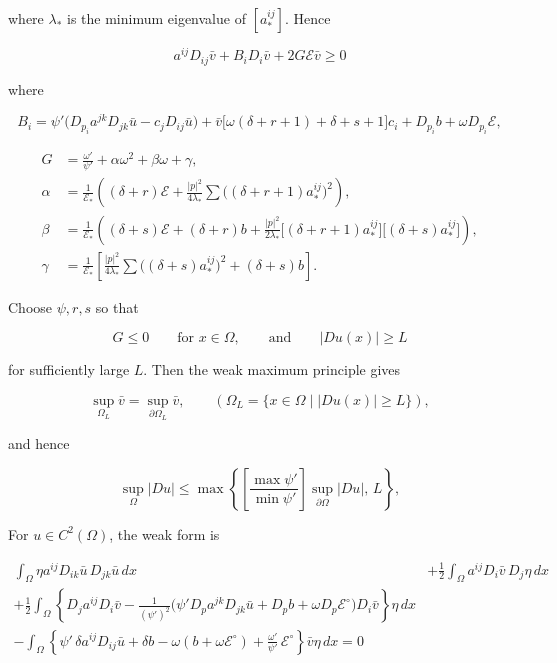 where \(\lambda_*\) is the minimum eigenvalue of \([a_*^{ij}]\). Hence

\begin{equation}
a^{ij}D_{ij}\bar{v}+B_iD_i\bar{v}+2G\mathcal{E}\bar{v}\ge 0
\tag{15.25}
\end{equation}

where

\begin{equation}
B_i=\psi'\bigl(D_{p_i}a^{jk}D_{jk}\bar{u}-c_jD_{ij}\bar{u}\bigr)+\bar{v}\bigl[\omega(\delta+r+1)+\delta+s+1\bigr]c_i
+D_{p_i}b+\omega D_{p_i}\mathcal{E},
\tag{15.26}
\end{equation}

\begin{equation}\tag{15.27}
\begin{aligned}
G&=\frac{\omega'}{\psi'}+\alpha\omega^2+\beta\omega+\gamma,\\
\alpha &= \frac{1}{\mathcal{E}_*}\left((\delta+r)\mathcal{E} + \frac{|p|^2}{4\lambda_*}\sum\bigl((\delta+r+1)a_*^{ij}\bigr)^2\right),\\
\beta &= \frac{1}{\mathcal{E}_*}\left((\delta+s)\mathcal{E}+(\delta+r)b+\frac{|p|^2}{2\lambda_*}\bigl[(\delta+r+1)a_*^{ij}\bigr]\bigl[(\delta+s)a_*^{ij}\bigr]\right),\\
\gamma &= \frac{1}{\mathcal{E}_*}\left[\frac{|p|^2}{4\lambda_*}\sum\bigl((\delta+s)a_*^{ij}\bigr)^2+(\delta+s)b\right].
\end{aligned}
\end{equation}

Choose \(\psi,r,s\) so that

\begin{equation}\tag{15.28}
G\le 0 \qquad \text{for } x\in \Omega,\qquad \text{and}\qquad |Du(x)|\ge L
\end{equation}

for sufficiently large \(L\). Then the weak maximum principle gives

\[
\sup_{\Omega_L}\bar v=\sup_{\partial\Omega_L}\bar v,\qquad
(\Omega_L=\{x\in \Omega\mid |Du(x)|\ge L\}),
\]

and hence

\begin{equation}\tag{15.29}
\sup_{\Omega}|Du|\le \max\left\{\left[\frac{\max \psi'}{\min \psi'}\right]\sup_{\partial\Omega}|Du|,\,L\right\},
\end{equation}

For \(u\in C^2(\Omega)\), the weak form is

\begin{equation}\tag{15.30}
\begin{aligned}
\int_{\Omega}\eta a^{ij}D_{ik}\bar u\,D_{jk}\bar u\,dx
&+\frac{1}{2}\int_{\Omega} a^{ij}D_i\bar v\,D_j\eta\,dx\\
+\frac{1}{2}\int_{\Omega}\left\{D_j a^{ij}D_i\bar v-\frac{1}{(\psi')^2}\bigl(\psi' D_p a^{jk}D_{jk}\bar u + D_p b + \omega D_p \mathcal{E}^{\circ}\bigr)D_i\bar v\right\}\eta\,dx\\
-\int_{\Omega}\left\{\psi'\,\delta a^{ij}D_{ij}\bar u+\delta b-\omega(b+\omega\mathcal{E}^{\circ})+\frac{\omega'}{\psi'}\,\mathcal{E}^{\circ}\right\}\bar v\eta\,dx=0
\end{aligned}
\end{equation}

